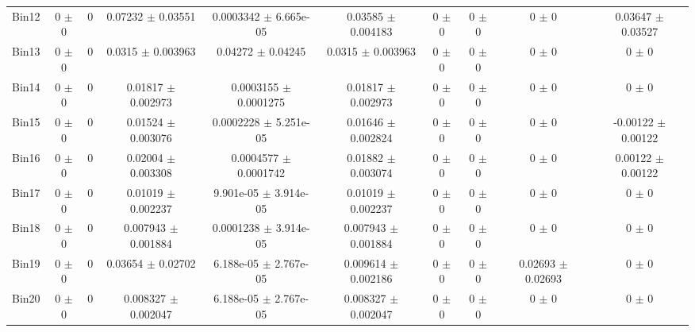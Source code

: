 \begin{tabular}{@{\extracolsep{4pt}}lccccccccc@{}}
     Bin12 & 0 $\pm$ 0 & 0 & 0.07232 $\pm$ 0.03551 & 0.0003342 $\pm$ 6.665e-05 & 0.03585 $\pm$ 0.004183 & 0 $\pm$ 0 & 0 $\pm$ 0 & 0 $\pm$ 0 & 0.03647 $\pm$ 0.03527 \\ 
     Bin13 & 0 $\pm$ 0 & 0 & 0.0315 $\pm$ 0.003963 & 0.04272 $\pm$ 0.04245 & 0.0315 $\pm$ 0.003963 & 0 $\pm$ 0 & 0 $\pm$ 0 & 0 $\pm$ 0 & 0 $\pm$ 0 \\ 
     Bin14 & 0 $\pm$ 0 & 0 & 0.01817 $\pm$ 0.002973 & 0.0003155 $\pm$ 0.0001275 & 0.01817 $\pm$ 0.002973 & 0 $\pm$ 0 & 0 $\pm$ 0 & 0 $\pm$ 0 & 0 $\pm$ 0 \\ 
     Bin15 & 0 $\pm$ 0 & 0 & 0.01524 $\pm$ 0.003076 & 0.0002228 $\pm$ 5.251e-05 & 0.01646 $\pm$ 0.002824 & 0 $\pm$ 0 & 0 $\pm$ 0 & 0 $\pm$ 0 & -0.00122 $\pm$ 0.00122 \\ 
     Bin16 & 0 $\pm$ 0 & 0 & 0.02004 $\pm$ 0.003308 & 0.0004577 $\pm$ 0.0001742 & 0.01882 $\pm$ 0.003074 & 0 $\pm$ 0 & 0 $\pm$ 0 & 0 $\pm$ 0 & 0.00122 $\pm$ 0.00122 \\ 
     Bin17 & 0 $\pm$ 0 & 0 & 0.01019 $\pm$ 0.002237 & 9.901e-05 $\pm$ 3.914e-05 & 0.01019 $\pm$ 0.002237 & 0 $\pm$ 0 & 0 $\pm$ 0 & 0 $\pm$ 0 & 0 $\pm$ 0 \\ 
     Bin18 & 0 $\pm$ 0 & 0 & 0.007943 $\pm$ 0.001884 & 0.0001238 $\pm$ 3.914e-05 & 0.007943 $\pm$ 0.001884 & 0 $\pm$ 0 & 0 $\pm$ 0 & 0 $\pm$ 0 & 0 $\pm$ 0 \\ 
     Bin19 & 0 $\pm$ 0 & 0 & 0.03654 $\pm$ 0.02702 & 6.188e-05 $\pm$ 2.767e-05 & 0.009614 $\pm$ 0.002186 & 0 $\pm$ 0 & 0 $\pm$ 0 & 0.02693 $\pm$ 0.02693 & 0 $\pm$ 0 \\ 
     Bin20 & 0 $\pm$ 0 & 0 & 0.008327 $\pm$ 0.002047 & 6.188e-05 $\pm$ 2.767e-05 & 0.008327 $\pm$ 0.002047 & 0 $\pm$ 0 & 0 $\pm$ 0 & 0 $\pm$ 0 & 0 $\pm$ 0 \\ 
\hline\hline
  \end{tabular}
